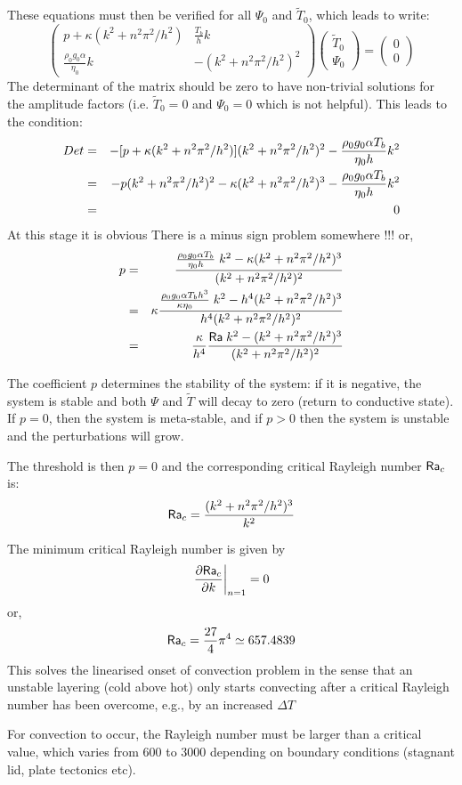 These equations must then be verified for all $\Psi_0$ and $\tilde{T}_0$, 
which leads to write:
\[
\left(
\begin{array}{cc}
p + \kappa (k^2+n^2\pi^2/h^2) & \frac{T_b}{h} k \\
\frac{\rho_0 g_0 \alpha}{\eta_0}  k  & -(k^2+n^2\pi^2/h^2)^2 
\end{array}
\right)
\left(
\begin{array}{c}
\tilde{T}_0 \\ \Psi_0
\end{array}
\right)
=
\left(
\begin{array}{c}
0 \\ 0
\end{array}
\right)
\]
The determinant of the matrix should be zero to have non-trivial solutions for
the amplitude factors (i.e. $\tilde{T}_0=0$ and $\Psi_0=0$ which is not helpful).
This leads to the condition: 
\begin{eqnarray}
Det 
&=& -[p + \kappa (k^2+n^2\pi^2/h^2)](k^2+n^2\pi^2/h^2)^2 - \frac{\rho_0 g_0 \alpha T_b }{\eta_0 h}  k^2 \nonumber\\
&=& -p (k^2+n^2\pi^2/h^2)^2 - \kappa (k^2+n^2\pi^2/h^2)^3 - \frac{\rho_0 g_0 \alpha T_b }{\eta_0 h}  k^2 \nonumber\\
&=& 0
\end{eqnarray}
{\color{red}At this stage it is obvious There is a minus sign problem somewhere !!!}
or, 
\begin{eqnarray}
p 
&=&\frac{\frac{\rho_0 g_0 \alpha T_b }{\eta_0 h }  \; k^2 
- \kappa (k^2+n^2\pi^2/h^2)^3 }{ (k^2+n^2\pi^2/h^2)^2} \nonumber\\
&=& \kappa \frac{  \frac{\rho_0 g_0 \alpha T_b h^3}{ \kappa \eta_0}\; k^2 - h^4 (k^2+n^2\pi^2/h^2)^3 }{h^4 (k^2+n^2\pi^2/h^2)^2} \nonumber\\
&=& \frac{\kappa}{h^4}   \frac{{\mathsf{Ra}} \; k^2 -(k^2+n^2\pi^2/h^2)^3 }{ (k^2+n^2\pi^2/h^2)^2}
\end{eqnarray}

The coefficient $p$ determines the stability of the system: if it is negative, 
the system is stable and both $\Psi$ and $\tilde{T}$ will decay to zero (return to conductive state). 
If $p=0$, then the system is meta-stable, and if $p>0$ then the system is unstable and 
the perturbations will grow. 

The threshold is then $p=0$ and the corresponding critical Rayleigh number ${\mathsf{Ra}}_c$ is:
\[
{\mathsf{Ra}}_c=\frac{(k^2+n^2\pi^2/h^2)^3}{k^2}
\]

The minimum critical Rayleigh number is given by 
\[
\left. \frac{\partial {\mathsf{Ra}}_c}{\partial k}\right|_{n=1}=0
\]
or, 
\[
{\mathsf{Ra}}_c = \frac{27}{4}\pi^4 \simeq 657.4839
\]
This solves the linearised onset of convection problem in the sense that an
unstable layering (cold above hot) only starts convecting after a critical
Rayleigh number has been overcome, e.g., by an increased $\Delta T$



For convection to occur,
the Rayleigh number must be larger than a critical value,
which varies from 600 to 3000 depending 
on boundary conditions (stagnant lid, plate tectonics etc).	

